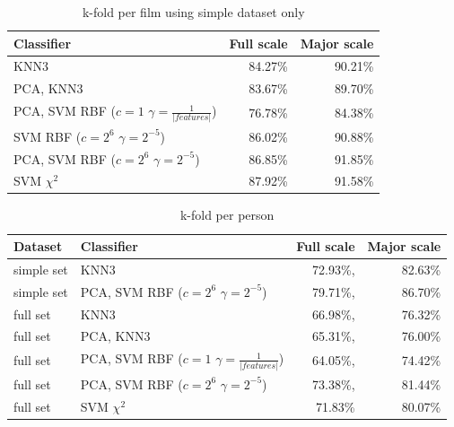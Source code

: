 \begin{table}
\centering
\begin{tabular}{lrr}
\hline\hline
Classifier 				&  	Full scale	& Major scale	\\
\hline
KNN3 		&  	84.27\%		& 90.21\%		\\
PCA, KNN3 	& 	83.67\%		& 89.70\%		\\
PCA, SVM RBF ($c=1$ $\gamma=\frac{1}{|features|}$)	& 	76.78\%		& 84.38\%		\\
SVM RBF ($c=2^6$ $\gamma=2^{-5}$) & 86.02\% & 90.88\% \\
PCA, SVM RBF ($c=2^6$ $\gamma=2^{-5}$) &  86.85\% & 91.85\% \\
SVM $\chi^2$ & 87.92\% 		& 91.58\% \\
\hline
\end{tabular}
\caption{k-fold per film using simple dataset only}
\end{table}


\begin{table}
\centering
\begin{tabular}{llrr}
\hline\hline
Dataset & Classifier 				&  	Full scale	& Major scale	\\
\hline
simple set	& KNN3	& 72.93\%, & 82.63\%	\\
simple set	& PCA, SVM RBF ($c=2^6$ $\gamma=2^{-5}$) & 79.71\%, & 86.70\%	\\
full set	& KNN3 & 66.98\%, & 76.32\%	\\
full set	& PCA, KNN3 & 65.31\%, & 76.00\%	\\
full set	& PCA, SVM RBF ($c=1$ $\gamma=\frac{1}{|features|}$) & 64.05\%, & 74.42\%	\\
full set	& PCA, SVM RBF ($c=2^6$ $\gamma=2^{-5}$)& 73.38\%, & 81.44\%	\\
full set    & SVM $\chi^2$ &  71.83\% &80.07\% \\
\hline
\end{tabular}
\caption{k-fold per person}
\end{table}


